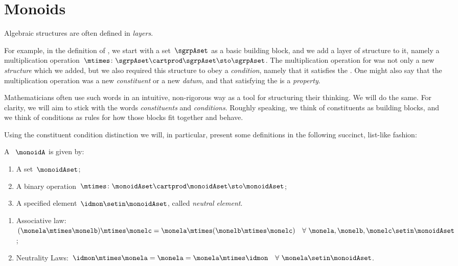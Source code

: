 
\section{Monoids}
\label{sec:parallelism-monoids}

Algebraic structures are often defined in \emph{layers}.

For example, in the definition of , we start with a set~$\sgrpAset$ as a basic building block, and we add a layer of structure to it, namely a multiplication operation~$\mtimes \colon \sgrpAset \cartprod \sgrpAset \sto \sgrpAset$.
The multiplication operation for  was not only a new \emph{structure} which we added, but we also required this structure to obey a \emph{condition}, namely that it satisfies the .
One might also say that the multiplication operation was a new \emph{constituent} or a new \emph{datum}, and that satisfying the  is a \emph{property}.

Mathematicians often use such words in an intuitive, non-rigorous way as a tool for structuring their thinking.
We will do the same.
For clarity, we will aim to stick with the words \emph{constituents} and \emph{conditions}.
Roughly speaking, we think of constituents as building blocks, and we think of conditions as rules for how those blocks fit together and behave.

Using the constituent \vs condition distinction we will, in particular, present some definitions in the following succinct, list-like fashion:

\begin{ctdefinition}[Monoid]
    \label{def:monoid}
    A ~$\monoidA$ is given by:
    \begin{body}
        \constit
        \begin{enumerate}
            \item A set~$\monoidAset$;
            \item A binary operation~$\mtimes \colon \monoidAset \cartprod \monoidAset \sto \monoidAset$;
            \item A specified element~$\idmon \setin \monoidAset$, called \emph{neutral element}.
        \end{enumerate}
        \condit
        \begin{enumerate}
            \item Associative law:~$(\monela\mtimes  \monelb)\mtimes  \monelc=
                      \monela\mtimes  (\monelb\mtimes  \monelc) \quad  \forall \  \monela, \monelb, \monelc \setin \monoidAset$;
            \item Neutrality Laws:~$\idmon\mtimes \monela=\monela=\monela\mtimes  \idmon \quad  \forall \ \monela \setin \monoidAset $.
        \end{enumerate}
    \end{body}
\end{ctdefinition}

